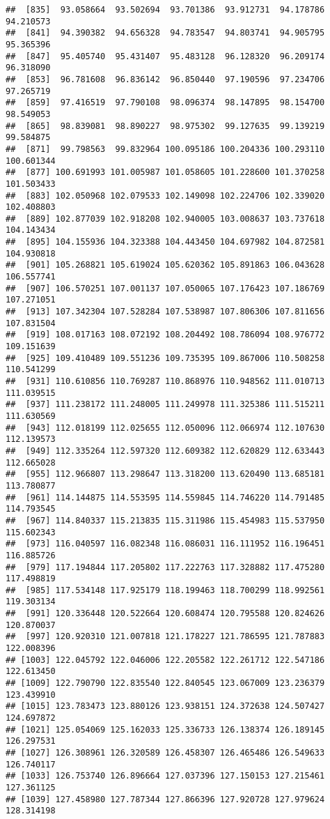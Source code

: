 \documentclass[]{article}
\begin{document}
\begin{verbatim}
##  [835]  93.058664  93.502694  93.701386  93.912731  94.178786  94.210573
##  [841]  94.390382  94.656328  94.783547  94.803741  94.905795  95.365396
##  [847]  95.405740  95.431407  95.483128  96.128320  96.209174  96.318090
##  [853]  96.781608  96.836142  96.850440  97.190596  97.234706  97.265719
##  [859]  97.416519  97.790108  98.096374  98.147895  98.154700  98.549053
##  [865]  98.839081  98.890227  98.975302  99.127635  99.139219  99.584875
##  [871]  99.798563  99.832964 100.095186 100.204336 100.293110 100.601344
##  [877] 100.691993 101.005987 101.058605 101.228600 101.370258 101.503433
##  [883] 102.050968 102.079533 102.149098 102.224706 102.339020 102.408803
##  [889] 102.877039 102.918208 102.940005 103.008637 103.737618 104.143434
##  [895] 104.155936 104.323388 104.443450 104.697982 104.872581 104.930818
##  [901] 105.268821 105.619024 105.620362 105.891863 106.043628 106.557741
##  [907] 106.570251 107.001137 107.050065 107.176423 107.186769 107.271051
##  [913] 107.342304 107.528284 107.538987 107.806306 107.811656 107.831504
##  [919] 108.017163 108.072192 108.204492 108.786094 108.976772 109.151639
##  [925] 109.410489 109.551236 109.735395 109.867006 110.508258 110.541299
##  [931] 110.610856 110.769287 110.868976 110.948562 111.010713 111.039515
##  [937] 111.238172 111.248005 111.249978 111.325386 111.515211 111.630569
##  [943] 112.018199 112.025655 112.050096 112.066974 112.107630 112.139573
##  [949] 112.335264 112.597320 112.609382 112.620829 112.633443 112.665028
##  [955] 112.966807 113.298647 113.318200 113.620490 113.685181 113.780877
##  [961] 114.144875 114.553595 114.559845 114.746220 114.791485 114.793545
##  [967] 114.840337 115.213835 115.311986 115.454983 115.537950 115.602343
##  [973] 116.040597 116.082348 116.086031 116.111952 116.196451 116.885726
##  [979] 117.194844 117.205802 117.222763 117.328882 117.475280 117.498819
##  [985] 117.534148 117.925179 118.199463 118.700299 118.992561 119.303134
##  [991] 120.336448 120.522664 120.608474 120.795588 120.824626 120.870037
##  [997] 120.920310 121.007818 121.178227 121.786595 121.787883 122.008396
## [1003] 122.045792 122.046006 122.205582 122.261712 122.547186 122.613450
## [1009] 122.790790 122.835540 122.840545 123.067009 123.236379 123.439910
## [1015] 123.783473 123.880126 123.938151 124.372638 124.507427 124.697872
## [1021] 125.054069 125.162033 125.336733 126.138374 126.189145 126.297531
## [1027] 126.308961 126.320589 126.458307 126.465486 126.549633 126.740117
## [1033] 126.753740 126.896664 127.037396 127.150153 127.215461 127.361125
## [1039] 127.458980 127.787344 127.866396 127.920728 127.979624 128.314198

\end{verbatim}
\end{document}
